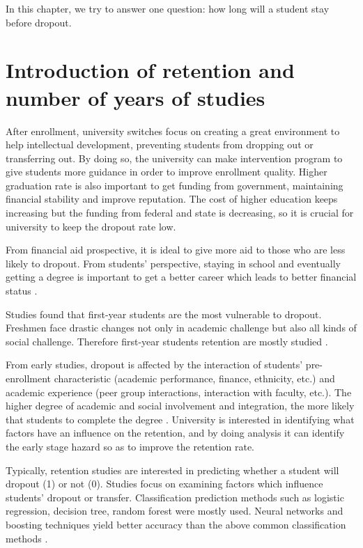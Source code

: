\documentclass[12pt,english]{report}
\begin{document}
In this chapter, we try to answer one question: how long will a student stay
before dropout. 

\section{Introduction of retention and number of years of studies}
After enrollment, university switches focus on creating a great environment to
help intellectual development, preventing students from dropping out or
transferring out.  By doing so, the university can make intervention program to
give students more guidance in order to  improve enrollment quality. Higher
graduation rate is also important to get funding from government, maintaining
financial stability and improve reputation. The cost of higher education keeps
increasing but the funding from federal and state is decreasing, so it is
crucial for university to keep the dropout rate low.

From financial aid prospective, it is ideal to give more aid to those who are
less likely to dropout. From students' perspective, staying in school and
eventually getting a degree is important to get a better career which leads to
better financial status \citep{thomas2002}. 


Studies found that first-year students are the most vulnerable to dropout.
Freshmen face drastic changes not only in academic challenge but also all kinds
of social challenge. Therefore first-year students retention are mostly studied
\citep{Permzadian2016,Kovacic10earlyprediction,Horstmanshof2007,Noble2007}. 


From early studies, dropout is affected by the interaction of students'
pre-enrollment characteristic (academic performance, finance, ethnicity, etc.) 
and academic experience (peer group interactions, interaction with faculty,
etc.). The higher degree of academic and social involvement and integration,
the more likely that students to complete the degree \citep{Tinto1975,
Tinto1982, Terenzini1981}. University is interested in identifying what factors
have an influence on the retention, and by doing analysis it can identify the
early stage hazard so as to improve the retention rate.

Typically, retention studies are interested in predicting whether a student
will dropout (1) or not (0). Studies focus on examining factors which influence
students' dropout or transfer. 
Classification prediction methods such as logistic regression, decision tree,
random forest were mostly
used\citep{dekker2009,AdamGaither2005,quadri2010drop,yu2010data,Herzog2006}.
Neural networks and boosting techniques yield better accuracy than the above
common classification methods \citep{Lin2009,zhang2010using,Herzog2006}.
\end{document}

